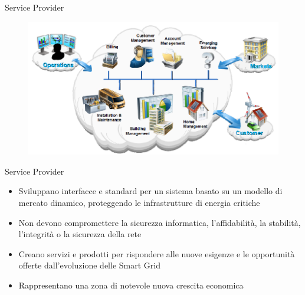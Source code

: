 


\begin{frame}[fragile]{Service Provider}
	\begin{figure}[h] 
		\includegraphics[scale=0.45]{imgs/ser.png}
	\end{figure}
\end{frame}

\begin{frame}[fragile]{Service Provider}
	\begin{itemize}[<+- | alert@+>]
		\item Sviluppano interfacce e standard per un sistema basato su un modello di mercato dinamico, proteggendo le infrastrutture di energia critiche   
		\item Non devono compromettere la sicurezza informatica, l'affidabilità, la stabilità, l'integrità o la sicurezza della rete %
		\item Creano servizi e prodotti per rispondere alle nuove esigenze e le opportunità offerte dall'evoluzione delle Smart Grid 
		\item Rappresentano una zona di notevole nuova crescita economica
	\end{itemize}
\end{frame}



